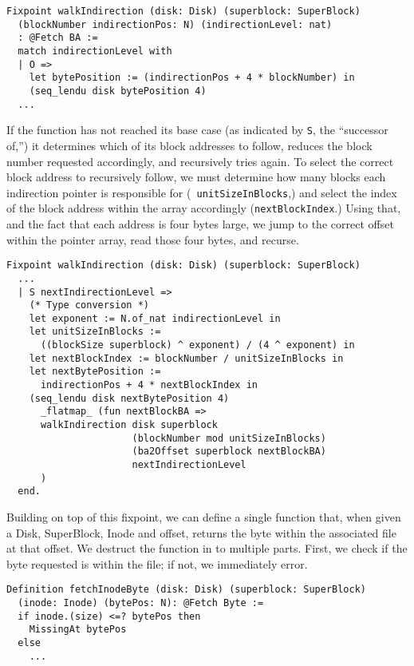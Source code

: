 \documentclass[nocopyrightspace]{sigplanconf}
\begin{document}
\begin{lstlisting}
Fixpoint walkIndirection (disk: Disk) (superblock: SuperBlock)
  (blockNumber indirectionPos: N) (indirectionLevel: nat) 
  : @Fetch BA :=
  match indirectionLevel with
  | O => 
    let bytePosition := (indirectionPos + 4 * blockNumber) in
    (seq_lendu disk bytePosition 4)
  ...
\end{lstlisting}

If the function has not reached its base case (as indicated by {\tt S}, the
``successor of,'') it determines which of its block addresses to follow,
reduces the block number requested accordingly, and recursively tries again.
To select the correct block address to recursively follow, we must determine
how many blocks each indirection pointer is responsible for ({\tt
unitSizeInBlocks},) and select the index of the block address within the array
accordingly ({\tt nextBlockIndex}.) Using that, and the fact that each address
is four bytes large, we jump to the correct offset within the pointer array,
read those four bytes, and recurse.

\begin{lstlisting}
Fixpoint walkIndirection (disk: Disk) (superblock: SuperBlock)
  ...
  | S nextIndirectionLevel =>
    (* Type conversion *)
    let exponent := N.of_nat indirectionLevel in
    let unitSizeInBlocks := 
      ((blockSize superblock) ^ exponent) / (4 ^ exponent) in
    let nextBlockIndex := blockNumber / unitSizeInBlocks in
    let nextBytePosition := 
      indirectionPos + 4 * nextBlockIndex in
    (seq_lendu disk nextBytePosition 4) 
      _flatmap_ (fun nextBlockBA =>
      walkIndirection disk superblock 
                      (blockNumber mod unitSizeInBlocks)
                      (ba2Offset superblock nextBlockBA)
                      nextIndirectionLevel
      )
  end.
\end{lstlisting}

Building on top of this fixpoint, we can define a single function that, when
given a Disk, SuperBlock, Inode and offset, returns the byte within the
associated file at that offset. We destruct the function in to multiple parts.
First, we check if the byte requested is within the file; if not, we
immediately error.

\begin{lstlisting}
Definition fetchInodeByte (disk: Disk) (superblock: SuperBlock)
  (inode: Inode) (bytePos: N): @Fetch Byte :=
  if inode.(size) <=? bytePos then 
    MissingAt bytePos
  else 
    ...
\end{lstlisting}
\end{document}
